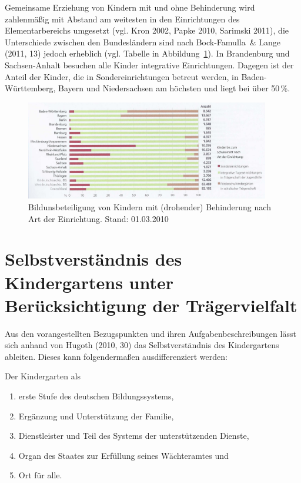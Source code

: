 Gemeinsame Erziehung von Kindern mit und ohne Behinderung wird zahlenmäßig mit Abstand am weitesten in den Einrichtungen des Elementarbereichs umgesetzt (vgl. Kron 2002, Papke 2010, Sarimski 2011), die Unterschiede zwischen den Bundesländern sind nach Bock-Famulla~\& Lange (2011, 13) jedoch erheblich (vgl. Tabelle in Abbildung~\ref{bild:bildungsbeteiligung}). In Brandenburg und Sachsen-Anhalt besuchen alle Kinder integrative Einrichtungen. Dagegen ist der Anteil der Kinder, die in Sondereinrichtungen betreut werden, in Baden-Württemberg, Bayern und Niedersachsen am höchsten und liegt bei über 50\,\%. 
\begin{figure}
  \centering
  \includegraphics[width=0.95\textwidth]{bilder/bildungsbeteiligung}
  \caption{Bildunsbeteiligung von Kindern mit (drohender) Behinderung nach Art der Einrichtung. Stand: 01.03.2010}
  \label{bild:bildungsbeteiligung}
\end{figure}


\section{Selbstverständnis des Kindergartens unter Berücksichtigung der Trägervielfalt}\label{sec:kitaSelbst}
Aus den vorangestellten Bezugspunkten und ihren Aufgabenbeschreibungen lässt sich anhand von Hugoth (2010, 30) das Selbstverständnis des Kindergartens ableiten. Dieses kann folgendermaßen ausdifferenziert werden:

Der Kindergarten als
\begin{enumerate}
\item erste Stufe des deutschen Bildungssystems,
\item Ergänzung und Unterstützung der Familie,
\item Dienstleister und Teil des Systems der unterstützenden Dienste,
\item Organ des Staates zur Erfüllung seines Wächteramtes und 
\item Ort für alle.
\end{enumerate}

